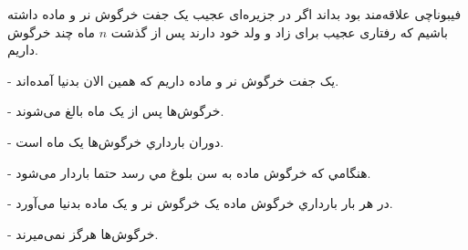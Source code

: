 \begin{PROBLEM}
\p
فیبوناچی علاقه‌مند بود بداند
 اگر در جزیره‌ای عجیب يک جفت خرگوش نر و ماده داشته باشیم که رفتاری عجیب برای زاد و ولد خود دارند پس از گذشت 
 $n$
 ماه چند خرگوش داریم.

-  يک جفت خرگوش نر و ماده داريم که همين الان بدنيا آمده‌اند.

- خرگوش‌ها پس از يک ماه بالغ می‌شوند.

- دوران بارداري خرگوش‌ها يک ماه است.

- هنگامي که خرگوش ماده به سن بلوغ مي رسد حتما باردار می‌شود.

- در هر بار بارداري خرگوش ماده يک خرگوش نر و يک ماده بدنيا می‌آورد.

- خرگوش‌ها هرگز نمی‌ميرند. 


\end{PROBLEM}
